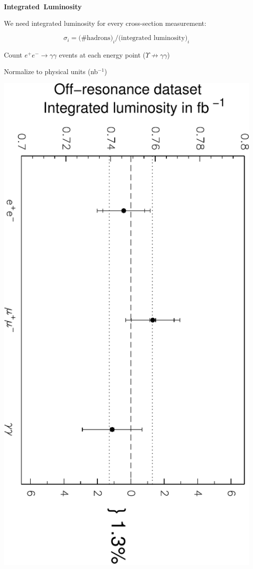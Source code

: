 \documentclass[landscape]{article}
\newenvironment{slide}[1][ ]{\mbox{\bf #1 } \vfill}{\vfill \mbox{ } \pagebreak}
\begin{document}
\begin{slide}[Integrated Luminosity]

\vspace{0.4 cm} We need integrated luminosity for every cross-section measurement:

\[ \sigma_i = \mbox{(\# hadrons)}_i / \mbox{(integrated luminosity)}_i \]

\vspace{0.7 cm}
Count $e^+e^- \to \gamma\gamma$ events at each energy point ($\Upsilon \not\to \gamma\gamma$)

\vspace{0.8 cm} Normalize to physical units (nb$^{-1}$)

\vspace{0.5 cm}
\begin{center}
  \includegraphics[width=0.8\linewidth]{panic_lumi}
\end{center}

\end{slide}
\end{document}
